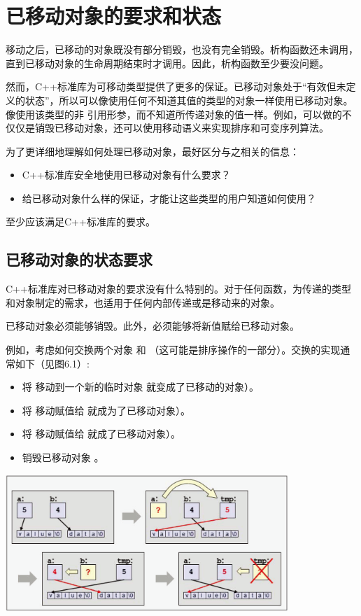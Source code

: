 \section{已移动对象的要求和状态}
移动之后，已移动的对象既没有部分销毁，也没有完全销毁。析构函数还未调用，直到已移动对象的生命周期结束时才调用。因此，析构函数至少要没问题。

然而，C++标准库为可移动类型提供了更多的保证。已移动对象处于“有效但未定义的状态”，所以可以像使用任何不知道其值的类型的对象一样使用已移动对象。像使用该类型的非  引用形参，而不知道所传递对象的值一样。例如，可以做的不仅仅是销毁已移动对象，还可以使用移动语义来实现排序和可变序列算法。

为了更详细地理解如何处理已移动对象，最好区分与之相关的信息：

\begin{itemize}
	\item C++标准库安全地使用已移动对象有什么要求？
	\item 给已移动对象什么样的保证，才能让这些类型的用户知道如何使用？
\end{itemize}

至少应该满足C++标准库的要求。

\subsection{已移动对象的状态要求}

C++标准库对已移动对象的要求没有什么特别的。对于任何函数，为传递的类型和对象制定的需求，也适用于任何内部传递或是移动来的对象。

已移动对象必须能够销毁。此外，必须能够将新值赋给已移动对象。

例如，考虑如何交换两个对象  和 （这可能是排序操作的一部分）。交换的实现通常如下（见图6.1）:

\begin{itemize}
	\item 将  移动到一个新的临时对象  就变成了已移动的对象）。
	\item 将  移动赋值给  就成为了已移动对象）。
	\item 将  移动赋值给  就成了已移动对象）。
	\item 销毁已移动对象 。
\end{itemize}

\begin{center}
	\includegraphics[width=0.8\textwidth]{part1/ch6/images/1}
\end{center}

